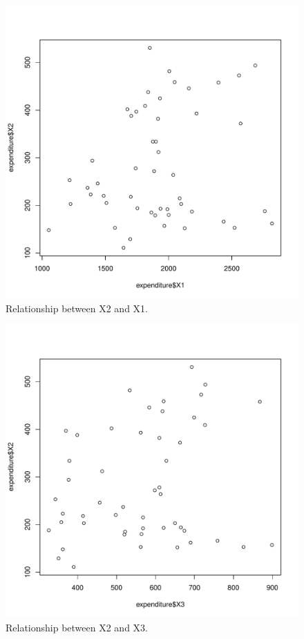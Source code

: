 \documentclass[12pt,letterpaper]{article}
\begin{document}
\begin{itemize}
\begin{figure}[hbtp!]\centering
	\caption{\footnotesize Relationship between X2 and X1.}
	\label{fig:plot_8}
	\includegraphics[width=.75\textwidth]{plot_X2_X1.pdf}
\end{figure}

\begin{figure}[hbtp!]\centering
	\caption{\footnotesize Relationship between X2 and X3.}
	\label{fig:plot_9}
	\includegraphics[width=.75\textwidth]{plot_X2_X3.pdf}
\end{figure}


\end{itemize}
\end{document}
